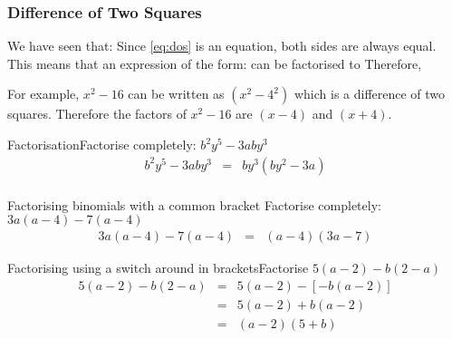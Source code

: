 \documentclass[10pt,a4paper,titlepage,twoside,openright]{report}
\begin{document}

\subsubsection{Difference of Two Squares}
We have seen that:
Since \ref{eq:dos} is an equation, both sides are always equal. This means that an expression of the form:
can be factorised to
Therefore,

For example, $x^2-16$ can be written as $(x^2-4^2)$ which is a difference of two squares. Therefore the factors of $x^2-16$ are $(x-4)$ and $(x+4)$.

\begin{wex}{Factorisation}{Factorise completely: $b^2y^5 - 3aby^3$}{
	\begin{eqnarray*}
	b^2y^5 - 3aby^3 &=& by^3(by^2-3a)\\
	\end{eqnarray*}}
\end{wex}
\begin{wex}{Factorising binomials with a common bracket}
{Factorise completely:  $3a(a - 4) - 7(a - 4)$}{
	\begin{eqnarray*}
	3a(a - 4) - 7(a - 4) &=& (a - 4)(3a - 7)
	\end{eqnarray*}}
\end{wex}
\begin{wex}{Factorising using a switch around in brackets}{Factorise $5(a-2)-b(2-a)$}{
	\begin{eqnarray*}
	5(a-2) - b(2-a) &=& 5(a-2)-[-b(a-2)]\\
	&=& 5(a-2) + b(a-2)\\
	&=& (a-2)(5+b)
	\end{eqnarray*}}
\end{wex}
\end{document}
